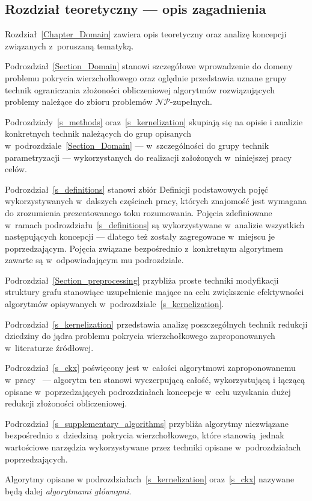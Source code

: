 \subsection{Rozdział teoretyczny --- opis zagadnienia}
\par{
  Rozdział~\ref{Chapter_Domain} zawiera opis teoretyczny oraz analizę koncepcji związanych z~poruszaną tematyką.

  Podrozdział~\ref{Section_Domain} stanowi szczegółowe wprowadzenie do domeny problemu pokrycia wierzchołkowego oraz oględnie przedstawia uznane grupy technik ograniczania złożoności obliczeniowej algorytmów rozwiązujących problemy należące do zbioru problemów $\mathcal{NP}$-zupełnych.

  Podrozdziały~\ref{s_methods} oraz~\ref{s_kernelization} skupiają się na opisie i analizie konkretnych technik należących do grup opisanych w~podrozdziale~\ref{Section_Domain} --- w~szczególności do grupy technik parametryzacji --- wykorzystanych do realizacji założonych w~niniejszej pracy celów.

  Podrozdział~\ref{s_definitions} stanowi zbiór Definicji podstawowych pojęć wykorzystywanych w~dalszych częściach pracy, których znajomość jest wymagana do zrozumienia prezentowanego toku rozumowania.
  Pojęcia zdefiniowane w~ramach podrozdziału~\ref{s_definitions} są wykorzystywane w~analizie wszystkich następujących koncepcji --- dlatego też zostały zagregowane w~miejscu je poprzedzającym.
  Pojęcia związane bezpośrednio z~konkretnym algorytmem zawarte są w~odpowiadającym mu podrozdziale.

  Podrozdział~\ref{Section_preprocessing} przybliża proste techniki modyfikacji struktury grafu stanowiące uzupełnienie mające na celu zwiększenie efektywności algorytmów opisywanych w~podrozdziale~\ref{s_kernelization}.

  Podrozdział~\ref{s_kernelization} przedstawia analizę poszczególnych technik redukcji dziedziny do jądra problemu pokrycia wierzchołkowego zaproponowanych w~literaturze źródłowej.

  Podrozdział~\ref{s_ckx} poświęcony jest w~całości algorytmowi zaproponowanemu w~pracy~\cite{ImprovedBounds10} --- algorytm ten stanowi wyczerpującą całość, wykorzystującą i łączącą opisane w~poprzedzających podrozdziałach koncepcje w~celu uzyskania dużej redukcji złożoności obliczeniowej.

  Podrozdział~\ref{s_supplementary_algorithms} przybliża algorytmy niezwiązane bezpośrednio z~dziedziną pokrycia wierzchołkowego, które stanowią jednak wartościowe narzędzia wykorzystywane przez techniki opisane w~podrozdziałach poprzedzających.

  Algorytmy opisane w podrozdziałach~\ref{s_kernelization} oraz~\ref{s_ckx} nazywane będą dalej \emph{algorytmami głównymi}.
}
